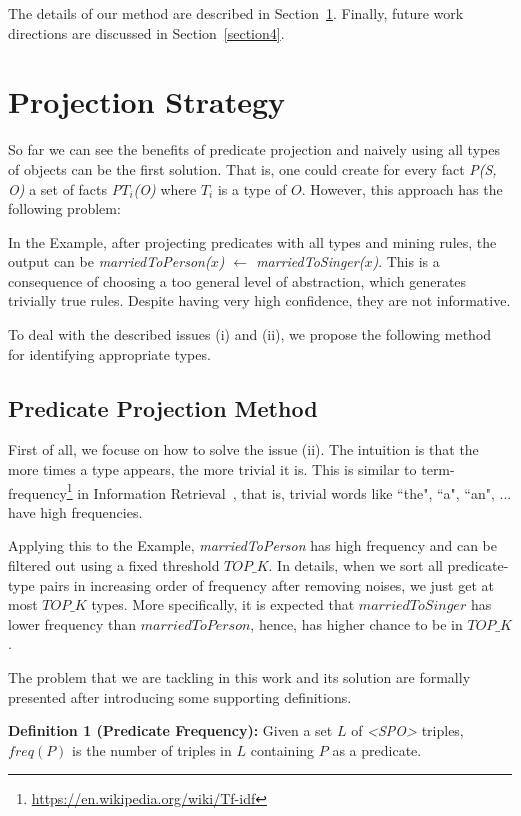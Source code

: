 \documentclass{acm_proc_article-sp}
\begin{document}
The details of our method are described in Section~\ref{section2}. Finally, future work directions are discussed in Section~\ref{section4}.

\section{Projection Strategy}
\label{section2}

So far we can see the benefits of predicate projection and naively using all types of objects can be the first solution. That is, one could create for every fact \textit{P(S, O)} a set of facts \textit{P$T_{i}$(O)} where \textit{$T_{i}$} is a type of $O$. However, this approach has the following problem:

In the Example, after projecting predicates with all types and mining rules, the output can be \textit{marriedToPerson($x$) $\leftarrow$ marriedToSinger($x$)}. This is a consequence of choosing a too general level of abstraction, which generates trivially true rules. Despite having very high confidence, they are not informative.

To deal with the described issues (i) and (ii), we propose the following method for identifying appropriate types.

\subsection{Predicate Projection Method}

First of all, we focuse on how to solve the issue (ii). The intuition is that the more times a type appears, the more trivial it is. This is similar to term-frequency\footnote{\url{https://en.wikipedia.org/wiki/Tf-idf}} in Information Retrieval~\cite{ref2}, that is, trivial words like ``the", ``a", ``an", ... have high frequencies.

Applying this to the Example, \textit{marriedToPerson} has high frequency and can be filtered out using a fixed threshold $TOP\_K$. In details, when we sort all predicate-type pairs in increasing order of frequency after removing noises, we just get at most $TOP\_K$ types. More specifically, it is expected that $marriedToSinger$ has lower frequency than $marriedToPerson$, hence, has higher chance to be in $TOP\_K$.

The problem that we are tackling in this work and its solution are formally presented after introducing some supporting definitions.

\textbf{Definition 1 (Predicate Frequency):} Given a set $L$ of \textit{<SPO>} triples, $freq(P)$ is the number of triples in $L$ containing $P$ as a predicate.
\end{document}
